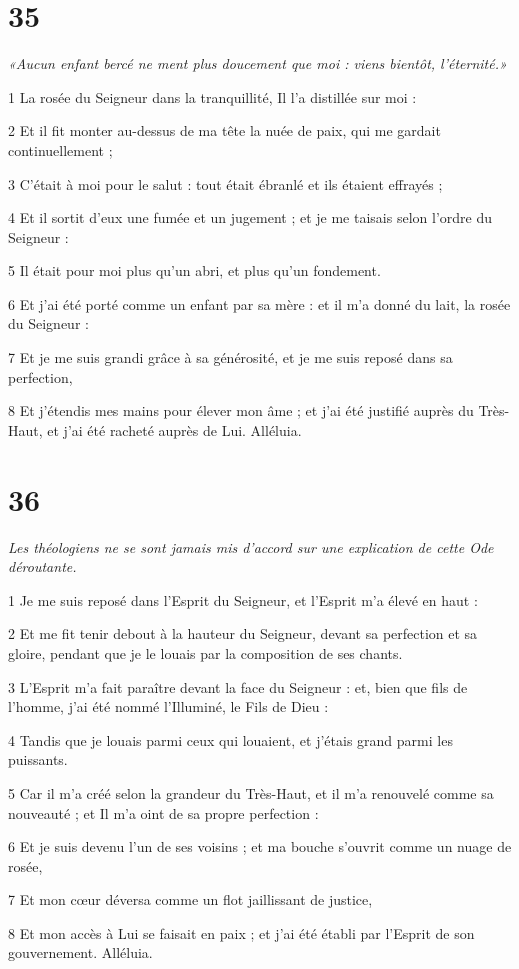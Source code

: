 \chapter{35}

\par \textit{«Aucun enfant bercé ne ment plus doucement que moi : viens bientôt, l'éternité.»}

\par 1 La rosée du Seigneur dans la tranquillité, Il l'a distillée sur moi :
\par 2 Et il fit monter au-dessus de ma tête la nuée de paix, qui me gardait continuellement ;
\par 3 C'était à moi pour le salut : tout était ébranlé et ils étaient effrayés ;
\par 4 Et il sortit d'eux une fumée et un jugement ; et je me taisais selon l'ordre du Seigneur :
\par 5 Il était pour moi plus qu'un abri, et plus qu'un fondement.
\par 6 Et j'ai été porté comme un enfant par sa mère : et il m'a donné du lait, la rosée du Seigneur :
\par 7 Et je me suis grandi grâce à sa générosité, et je me suis reposé dans sa perfection,
\par 8 Et j'étendis mes mains pour élever mon âme ; et j'ai été justifié auprès du Très-Haut, et j'ai été racheté auprès de Lui. Alléluia.

\chapter{36}

\par \textit{Les théologiens ne se sont jamais mis d'accord sur une explication de cette Ode déroutante.}

\par 1 Je me suis reposé dans l'Esprit du Seigneur, et l'Esprit m'a élevé en haut :
\par 2 Et me fit tenir debout à la hauteur du Seigneur, devant sa perfection et sa gloire, pendant que je le louais par la composition de ses chants.
\par 3 L'Esprit m'a fait paraître devant la face du Seigneur : et, bien que fils de l'homme, j'ai été nommé l'Illuminé, le Fils de Dieu :
\par 4 Tandis que je louais parmi ceux qui louaient, et j'étais grand parmi les puissants.
\par 5 Car il m'a créé selon la grandeur du Très-Haut, et il m'a renouvelé comme sa nouveauté ; et Il m'a oint de sa propre perfection :
\par 6 Et je suis devenu l'un de ses voisins ; et ma bouche s'ouvrit comme un nuage de rosée,
\par 7 Et mon cœur déversa comme un flot jaillissant de justice,
\par 8 Et mon accès à Lui se faisait en paix ; et j'ai été établi par l'Esprit de son gouvernement. Alléluia.

